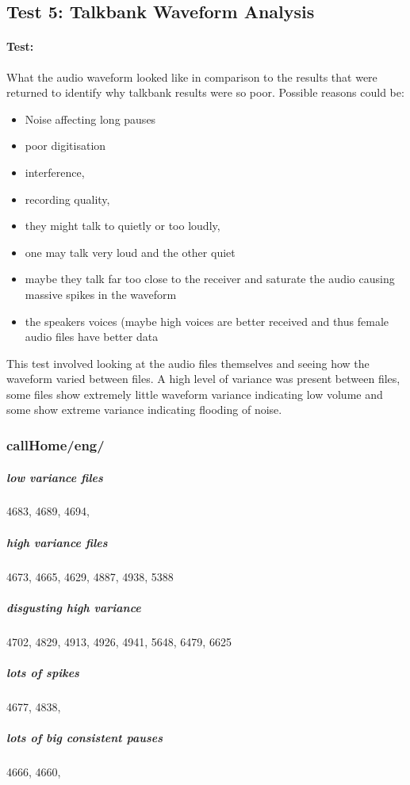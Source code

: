 \subsection{Test 5: Talkbank Waveform Analysis}
	\paragraph{Test:} 
	What the audio waveform looked like in comparison to the results that were returned to identify why talkbank results were so poor. 
	Possible reasons could be:
	\begin{itemize}
	\item{Noise affecting long pauses} 
	\item{poor digitisation} 
		\item interference,
		\item recording quality, 
		\item they might talk to quietly or too loudly,
		\item one may talk very loud and the other quiet
		\item maybe they talk far too close to the receiver and saturate the audio causing massive spikes in the waveform 
		\item the speakers voices (maybe high voices are better received and thus female audio files have better data
	\end{itemize}

This test involved looking at the audio files themselves and seeing how the waveform varied between files. A high level of variance was present between files, some files show extremely little waveform variance indicating low volume and some show extreme variance indicating flooding of noise. \\

	\subsubsection{callHome/eng/}
	
	\subparagraph{low variance files} 4683, 4689, 4694, 
	
	\subparagraph{high variance files} 4673, 4665, 4629, 4887, 4938, 5388
	
	\subparagraph{disgusting high variance} 4702, 4829, 4913, 4926, 4941, 5648, 6479, 6625

	\subparagraph{lots of spikes} 4677, 4838, 

	\subparagraph{lots of big consistent pauses} 4666, 4660, 
	
